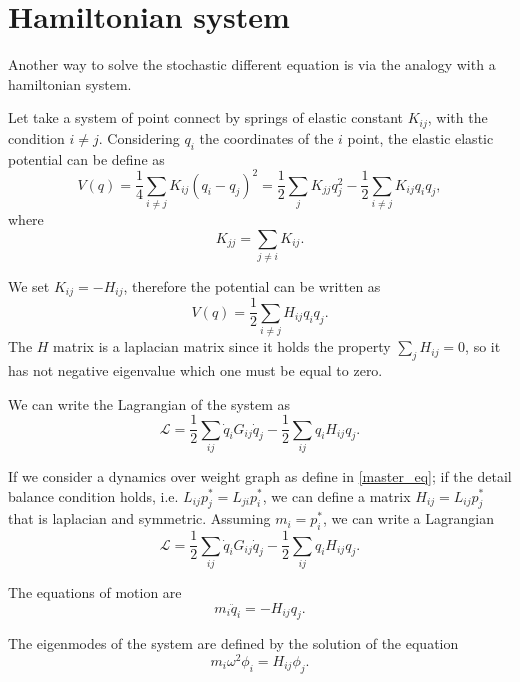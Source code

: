 \chapter{Hamiltonian system}
Another way to solve the stochastic different equation is via the analogy with a hamiltonian system.

Let take a system of point connect by springs of elastic constant $K_{ij}$, with the condition $i \neq j$. 
Considering $q_i$ the coordinates of the $i$ point, the elastic elastic potential can be define as
\begin{equation}
    V(q) = \frac{1}{4}\sum_{i\neq j} K_{ij}(q_i-q_j)^2 = \frac{1}{2}\sum_{j}K_{jj}q_j^2 - \frac{1}{2} \sum_{i\neq j}K_{ij}q_iq_j,
\end{equation}
where 
\begin{equation}
    K_{jj} = \sum_{j \neq i} K_{ij}.
\end{equation}

We set $K_{ij}=-H_{ij}$, therefore the potential can be written as
\begin{equation}
    V(q) = \frac{1}{2}\sum_{i\neq j} H_{ij} q_i q_j.
\end{equation}
The $H$ matrix is a laplacian matrix since it holds the property $\sum_j H_{ij} = 0$, so it has not negative eigenvalue which one must be equal to zero. %

We can write the Lagrangian of the system as
\begin{equation}
    \mathcal{L} = \frac{1}{2}\sum_{ij} \dot q_i G_{ij} \dot q_j -\frac{1}{2} \sum_{ij} q_iH_{ij}q_j.
\end{equation}

If we consider a dynamics over weight graph as define in \ref{master_eq}; if the detail balance condition holds, i.e. $L_{ij}p_j^*=L_{ji} p_i^*$, we can define a matrix $H_{ij} = L_{ij}p_j^*$ that is laplacian and symmetric. Assuming $m_i = p_i^*$, we can write a Lagrangian 
\begin{equation}
    \mathcal{L} = \frac{1}{2}\sum_{ij} \dot q_i G_{ij} \dot q_j -\frac{1}{2} \sum_{ij} q_iH_{ij}q_j.
\end{equation}

The equations of motion are
\begin{equation}
    m_i \ddot q_i = -H_{ij} q_j.
\end{equation}

The eigenmodes of the system are defined by the solution of the equation 
\begin{equation}
    m_i \omega^2 \phi_i = H_{ij} \phi_j.
\end{equation}

